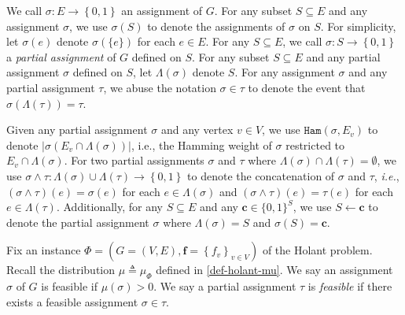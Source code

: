 \documentclass[11pt]{article}
\newcommand{\abs}[1]{\left\vert#1\right\vert}
\newcommand{\set}[1]{\left\{#1\right\}}
\def\!#1{\mathtt{#1}}
\def\IE{\emph{i.e.}}
\newcommand{\Ham}{\!{Ham}}
\newcommand{\Par}{\!{Par}}
\newcommand{\vecf}{\boldsymbol{f}}
\newcommand{\qtodo}[1]{\todo[color = purple!40, size = \tiny]{\textbf{guoliang:} #1}}
\newcommand{\hktodo}[1]{{\color{blue}{#1}}}
\begin{document}

We call $\sigma: E\rightarrow \set{0,1}$ an assignment of $G$.
For any subset $S\subseteq E$ and any assignment $\sigma$, we use $\sigma(S)$ to denote the assignments of $\sigma$ on $S$.
For simplicity, let $\sigma(e)$ denote $\sigma(\{e\})$ for each $e\in E$. For any $S\subseteq E$, we call $\sigma: S\rightarrow \set{0,1}$ a \emph{partial assignment} of $G$ defined on $S$.
For any subset $S \subseteq E$ and any partial assignment $\sigma$ defined on $S$, 
let $\Lambda(\sigma)$ denote $S$.
For any assignment $\sigma$ and any partial assignment $\tau$,
we abuse the notation $\sigma\in \tau$ to denote the event that $\sigma(\Lambda(\tau)) =\tau$.

Given any partial assignment $\sigma$ and any vertex $v \in V$, we use $\Ham(\sigma, E_v)$ to denote $\abs{\sigma(E_v \cap \Lambda(\sigma))}$, i.e., the Hamming weight of $\sigma$ restricted to $E_v \cap \Lambda(\sigma)$.
For two partial assignments $\sigma$ and $\tau$ where $\Lambda(\sigma)\cap \Lambda(\tau) = \emptyset$, we use $\sigma \land \tau : \Lambda(\sigma) \cup \Lambda(\tau) \to \set{0, 1}$ to denote the concatenation of $\sigma$ and $\tau$, \IE, $(\sigma \land \tau)(e)=\sigma(e)$ for each $e\in \Lambda(\sigma)$ and $(\sigma \land \tau)(e)=\tau(e)$ for each $e\in \Lambda(\tau)$. 
{Additionally, for any $S\subseteq E$ and any $\boldsymbol{c} \in \{0,1\}^S$, we use $S \gets \boldsymbol{c}$ to denote the partial assignment $\sigma$ where $\Lambda(\sigma) = S$ and $\sigma(S) = \boldsymbol{c}$.}

Fix an instance $ \Phi = \left(G = (V, E), \vecf = \set{f_v}_{v \in V}\right)$ of the Holant problem.
Recall the distribution $\mu \triangleq \mu_{\Phi}$ defined in \eqref{def-holant-mu}.
We say an assignment $\sigma$ of $G$ is feasible if $\mu(\sigma)>0$. 
We say a partial assignment $\tau$ is \emph{feasible} if there exists a feasible assignment $\sigma\in \tau$.




 
\end{document}
